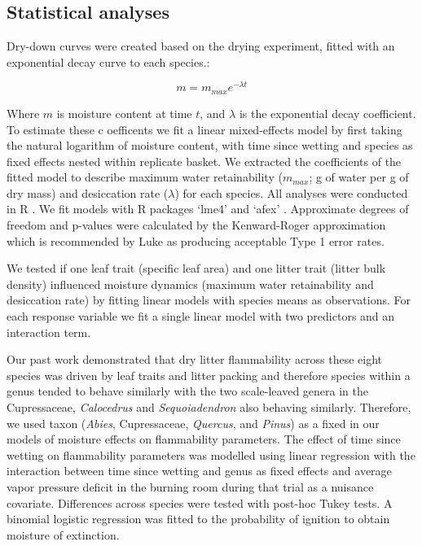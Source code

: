 \documentclass[fire,article,submit,moreauthors,pdftex]{Definitions/mdpi}
\begin{document}
\subsection{Statistical analyses}


Dry-down curves were created based on the drying experiment, fitted with an exponential decay curve to each species.:

\begin{equation}
m = m_{max} e^{-\lambda t}
\end{equation}

Where $m$ is moisture content at time $t$, and $\lambda$ is the exponential
decay coefficient. To estimate these c oefficents we fit a linear mixed-effects
model by first taking the natural logarithm of moisture content, with time
since wetting and species as fixed effects nested within replicate basket. We
extracted the coefficients of the fitted model to describe maximum water
retainability ($m_{max}$; g of water per g of dry mass) and desiccation rate
($\lambda$) for each species. All analyses were conducted in R
\cite{RCoreTeam-2019}. We fit models with R packages `lme4'
\cite{Bates_Machler_etal-2015} and `afex' \cite{Singmann_Bolker_etal-2017}.
Approximate degrees of freedom and p-values were calculated by the
Kenward-Roger approximation \cite{Kenward_Roger-1997} which is recommended by
Luke \cite{Luke-2017} as producing acceptable Type 1 error rates.

We tested if one leaf trait (specific leaf area) and one litter trait (litter
bulk density) influenced moisture dynamics (maximum water retainability and
desiccation rate) by fitting linear models with species means as observations.
For each response variable we fit a single linear model with two predictors and
an interaction term.

Our past work \cite{Magalhaes+Schwilk-2012} demonstrated that dry litter
flammability across these eight species was driven by leaf traits and litter
packing and therefore species within a genus tended to behave similarly with
the two scale-leaved genera in the Cupressaceae, \emph{Calocedrus} and
\emph{Sequoiadendron} also behaving similarly. Therefore, we used taxon
(\emph{Abies}, Cupressaceae, \emph{Quercus}, and \emph{Pinus}) as a fixed in
our models of moisture effects on flammability parameters. The effect of time
since wetting on flammability parameters was modelled using linear regression
with the interaction between time since wetting and genus as fixed effects and
average vapor pressure deficit in the burning room during that trial as a
nuisance covariate. Differences across species were tested with post-hoc Tukey
tests. A binomial logistic regression was fitted to the probability of ignition
to obtain moisture of extinction.
\end{document}
